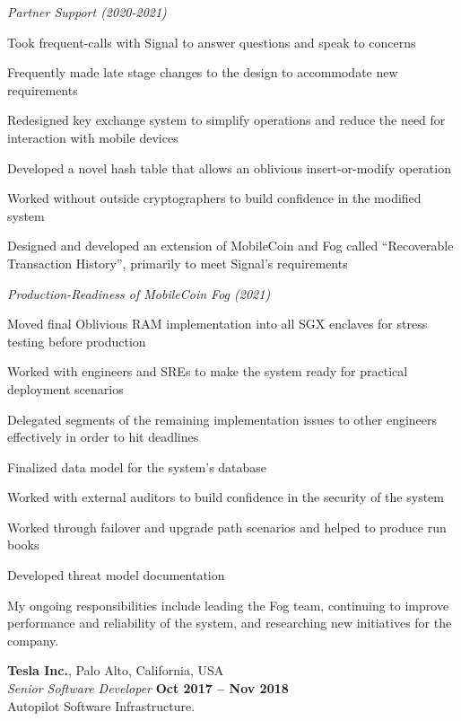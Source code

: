 \documentclass[margin,line]{resume}
\begin{document}
\begin{resume}
    \textsl{Partner Support (2020-2021)}
    \begin{list2}
    \item{Took frequent-calls with Signal to answer questions and speak to concerns}
    \item{Frequently made late stage changes to the design to accommodate new requirements}
    \item{Redesigned key exchange system to simplify operations and reduce the need for interaction with mobile devices}
    \item{Developed a novel hash table that allows an oblivious insert-or-modify operation}
    \item{Worked without outside cryptographers to build confidence in the modified system}
    \item{Designed and developed an extension of MobileCoin and Fog called ``Recoverable Transaction History'', primarily to meet Signal's requirements}
    \end{list2}

    \textsl{Production-Readiness of MobileCoin Fog (2021)}
    \begin{list2}
    \item{Moved final Oblivious RAM implementation into all SGX enclaves for stress testing before production}
    \item{Worked with engineers and SREs to make the system ready for practical deployment scenarios}
    \item{Delegated segments of the remaining implementation issues to other engineers effectively in order to hit deadlines}
    \item{Finalized data model for the system's database}
    \item{Worked with external auditors to build confidence in the security of the system}
    \item{Worked through failover and upgrade path scenarios and helped to produce run books}
    \item{Developed threat model documentation}
    \end{list2}

    My ongoing responsibilities include leading the Fog team, continuing to improve performance and reliability of the system,
    and researching new initiatives for the company.

    \textbf{Tesla Inc.}, Palo Alto, California, USA \vspace{2mm}\\\vspace{1mm}%
    \textsl{Senior Software Developer} \hfill \textbf{Oct 2017 -- Nov 2018}\\
    Autopilot Software Infrastructure.
    

\end{resume}
\end{document}
